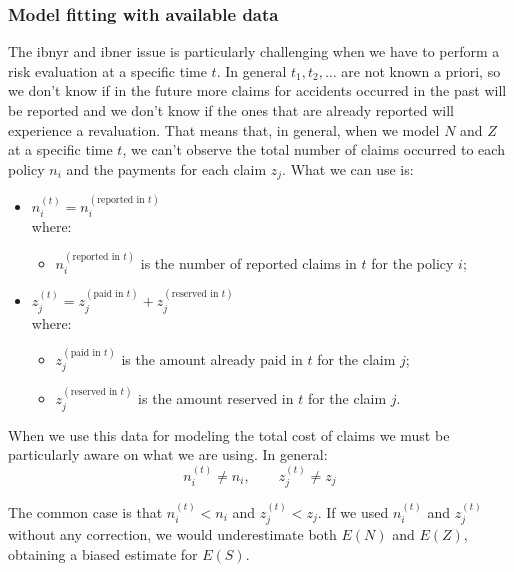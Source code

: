 \documentclass[a4paper, twoside, openright, 12pt]{report}
\providecommand{\tightlist}{%
  \setlength{\itemsep}{0pt}\setlength{\parskip}{0pt}}
\theoremstyle{definition}
\theoremstyle{definition}
\theoremstyle{definition}
\theoremstyle{remark}
\begin{document}
\hypertarget{model-fitting-with-available-data}{%
\subsubsection{Model fitting with available data}\label{model-fitting-with-available-data}}

The \ac{ibnyr} and \ac{ibner} issue is particularly challenging when we have to perform a risk evaluation at a specific time \(t\). In general \(t_1, t_2,\dots\) are not known a priori, so we don't know if in the future more claims for accidents occurred in the past will be reported and we don't know if the ones that are already reported will experience a revaluation. That means that, in general, when we model \(N\) and \(Z\) at a specific time \(t\), we can't observe the total number of claims occurred to each policy \(n_i\) and the payments for each claim \(z_j\). What we can use is:

\begin{itemize}
\tightlist
\item
  \(n_i^{(t)} = n_i^{(\text{reported in } t)}\)\\
  where:

  \begin{itemize}
  \tightlist
  \item
    \(n_i^{(\text{reported in } t)}\) is the number of reported claims in \(t\) for the policy \(i\);
  \end{itemize}
\item
  \(z_j^{(t)} = z_j^{(\text{paid in }t)} + z_j^{(\text{reserved in } t)}\)\\
  where:

  \begin{itemize}
  \tightlist
  \item
    \(z_j^{(\text{paid in }t)}\) is the amount already paid in \(t\) for the claim \(j\);
  \item
    \(z_j^{(\text{reserved in } t)}\) is the amount reserved in \(t\) for the claim \(j\).
  \end{itemize}
\end{itemize}

When we use this data for modeling the total cost of claims we must be particularly aware on what we are using. In general:
\[
n_i^{(t)} \ne n_i, \qquad z_j^{(t)} \ne z_j
\]

The common case is that \(n_i^{(t)} < n_i\) and \(z_j^{(t)} < z_j\). If we used \(n_i^{(t)}\) and \(z_j^{(t)}\) without any correction, we would underestimate both \(E(N)\) and \(E(Z)\), obtaining a biased estimate for \(E(S)\).
\end{document}
